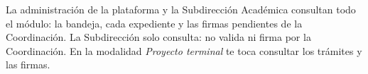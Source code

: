 \documentclass[11pt,a4paper]{article}
\begin{document}
{\small\tableofcontents}
\newpage
\begin{quevasahacer}
La administración de la plataforma y la Subdirección Académica consultan todo el módulo: la bandeja, cada expediente y las firmas pendientes de la Coordinación. La Subdirección solo consulta: no valida ni firma por la Coordinación. En la modalidad \emph{Proyecto terminal} te toca consultar los trámites y las firmas.
\end{quevasahacer}




\end{document}
